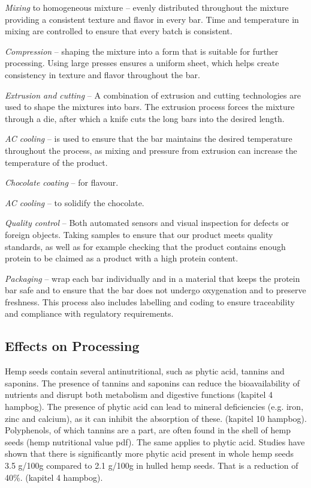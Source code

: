 \vspace{1em}
\textit{Mixing} to homogeneous mixture – evenly distributed throughout the mixture providing a consistent texture and flavor in every bar. Time and temperature in mixing are controlled to ensure that every batch is consistent.

\vspace{1em}
\textit{Compression} – shaping the mixture into a form that is suitable for further processing. Using large presses ensures a uniform sheet, which helps create consistency in texture and flavor throughout the bar.

\vspace{1em}
\textit{Extrusion and cutting} – A combination of extrusion and cutting technologies are used to shape the mixtures into bars. The extrusion process forces the mixture through a die, after which a knife cuts the long bars into the desired length.

\vspace{1em}
\textit{AC cooling} – is used to ensure that the bar maintains the desired temperature throughout the process, as mixing and pressure from extrusion can increase the temperature of the product.

\vspace{1em}
\textit{Chocolate coating} – for flavour.

\vspace{1em}
\textit{AC cooling} – to solidify the chocolate.

\vspace{1em}
\textit{Quality control} – Both automated sensors and visual inspection for defects or foreign objects. Taking samples to ensure that our product meets quality standards, as well as for example checking that the product contains enough protein to be claimed as a product with a high protein content. 

\vspace{1em}
\textit{Packaging} – wrap each bar individually and in a material that keeps the protein bar safe and to ensure that the bar does not undergo oxygenation and to preserve freshness. This process also includes labelling and coding to ensure traceability and compliance with regulatory requirements.

\subsection{Effects on Processing}
Hemp seeds contain several antinutritional, such as phytic acid, tannins and saponins. The presence of tannins and saponins can reduce the bioavailability of nutrients and disrupt both metabolism and digestive functions (kapitel 4 hampbog). The presence of phytic acid can lead to mineral deficiencies (e.g. iron, zinc and calcium), as it can inhibit the absorption of these. (kapitel 10 hampbog). Polyphenols, of which tannins are a part, are often found in the shell of hemp seeds (hemp nutritional value pdf). The same applies to phytic acid. Studies have shown that there is significantly more phytic acid present in whole hemp seeds 3.5 g/100g compared to 2.1 g/100g in hulled hemp seeds. That is a reduction of 40\%. (kapitel 4 hampbog).

